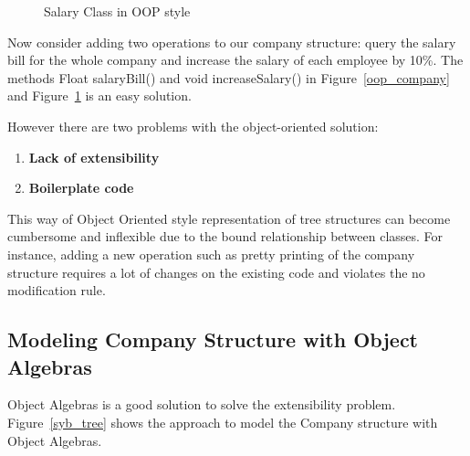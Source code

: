 \begin{figure}[tb]
\vspace{-.1in}
\caption{Salary Class in OOP style}
\label{oop_salary}
\end{figure}

Now consider adding two operations to our company structure: query the
salary bill for the whole company and increase the salary of each
employee by 10\%. The methods Float salaryBill() and void
increaseSalary() in Figure~\ref{oop_company} and
Figure~\ref{oop_salary} is an easy solution.

However there are two problems with the object-oriented solution:

\begin{enumerate}

\item {\bf Lack of extensibility} 

\item {\bf Boilerplate code} 

\end{enumerate}

This way of Object Oriented style representation of tree structures
can become cumbersome and inflexible due to the bound relationship
between classes. For instance, adding a new operation such as pretty
printing of the company structure requires a lot of changes on the
existing code and violates the no modification rule.



\subsection{Modeling Company Structure with Object Algebras}

Object Algebras is a good solution to solve the extensibility
problem.  
Figure~\ref{syb_tree} shows the approach to model the Company
structure with Object Algebras.

